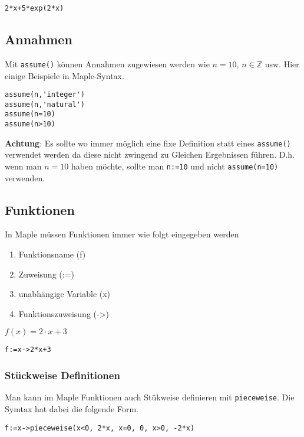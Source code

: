 \documentclass[a4paper,
               10pt,
               fleqn]{article}
\begin{document}
\begin{lstlisting}[caption=Euler, label=Euler]
2*x+5*exp(2*x)
\end{lstlisting}


\subsection{Annahmen}
Mit \verb!assume()! können Annahmen zugewiesen werden wie $n = 10$, 
$n \in \mathbb{Z}$ usw. Hier einige Beispiele in Maple-Syntax.

\begin{lstlisting}[caption=Annahmen, label=Annahmen]
assume(n,'integer')
assume(n,'natural')
assume(n=10)
assume(n>10)
\end{lstlisting}

\noindent
\textbf{Achtung}: Es sollte wo immer möglich eine fixe Definition statt
eines \verb!assume()! verwendet werden da diese nicht zwingend zu Gleichen 
Ergebnissen führen. D.h. wenn man $n=10$ haben möchte, sollte man 
\verb!n:=10! und nicht \verb!assume(n=10)! verwenden.

\subsection{Funktionen}
In Maple müssen Funktionen immer wie folgt eingegeben werden
\begin{enumerate}
	\item Funktionsname (f)
	\item Zuweisung (:=)
	\item unabhängige Variable (x)
	\item Funktionszuweisung (->)
\end{enumerate}

$f(x)=2 \cdot x + 3$

\begin{lstlisting}[caption=Funktionen, label=Funktionen]
f:=x->2*x+3
\end{lstlisting}

\subsubsection{Stückweise Definitionen}
Man kann im Maple Funktionen auch Stükweise definieren mit \verb!pieceweise!.
Die Symtax hat dabei die folgende Form.

\begin{lstlisting}[caption=Stückweise Definition, label=Stückweise Definition]
f:=x->pieceweise(x<0, 2*x, x=0, 0, x>0, -2*x)
\end{lstlisting}
\end{document}
